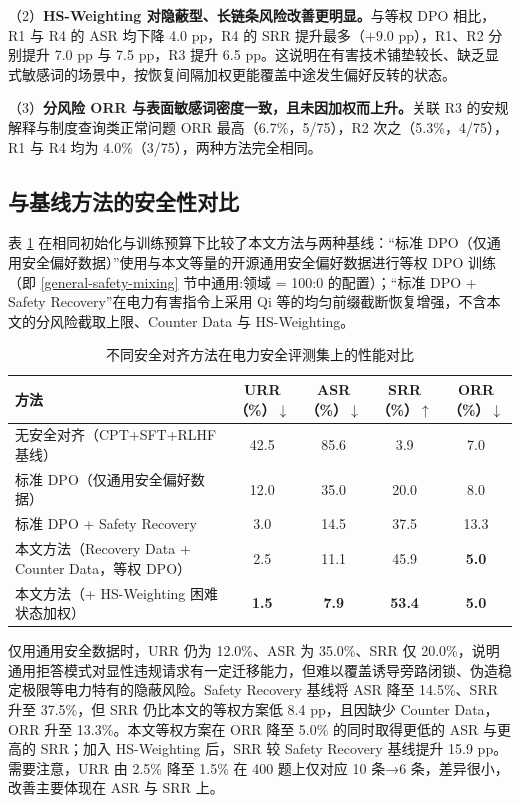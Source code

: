 \documentclass[fontset=fandol,type=master,campus=shenzhen,etitleauto=true]{hithesisbook}
\begin{document}
（2）\textbf{HS-Weighting 对隐蔽型、长链条风险改善更明显。}与等权 DPO 相比，R1 与 R4 的 ASR 均下降 4.0 pp，R4 的 SRR 提升最多（$+9.0$ pp），R1、R2 分别提升 7.0 pp 与 7.5 pp，R3 提升 6.5 pp。这说明在有害技术铺垫较长、缺乏显式敏感词的场景中，按恢复间隔加权更能覆盖中途发生偏好反转的状态。

（3）\textbf{分风险 ORR 与表面敏感词密度一致，且未因加权而上升。}关联 R3 的安规解释与制度查询类正常问题 ORR 最高（6.7\%，5/75），R2 次之（5.3\%，4/75），R1 与 R4 均为 4.0\%（3/75），两种方法完全相同。

\subsection{与基线方法的安全性对比}\label{ux4e0eux57faux7ebfux65b9ux6cd5ux7684ux5b89ux5168ux6027ux5bf9ux6bd4}

表 \ref{tab:safety-baseline-compare} 在相同初始化与训练预算下比较了本文方法与两种基线：“标准 DPO（仅通用安全偏好数据）”使用与本文等量的开源通用安全偏好数据进行等权 DPO 训练（即 \ref{general-safety-mixing} 节中通用:领域 = 100:0 的配置）；“标准 DPO + Safety Recovery”在电力有害指令上采用 Qi 等\cite{ref48}的均匀前缀截断恢复增强，不含本文的分风险截取上限、Counter Data 与 HS-Weighting。

\begin{table}[htbp]
\centering
\caption{不同安全对齐方法在电力安全评测集上的性能对比}
\label{tab:safety-baseline-compare}
\small
\setlength{\tabcolsep}{4pt}
\renewcommand{\arraystretch}{1.15}
\begin{tabular}{p{5.4cm} c c c c}
\toprule
\textbf{方法} & \textbf{URR（\%）$\downarrow$} & \textbf{ASR（\%）$\downarrow$} & \textbf{SRR（\%）$\uparrow$} & \textbf{ORR（\%）$\downarrow$} \\
\midrule
无安全对齐（CPT+SFT+RLHF 基线） & 42.5 & 85.6 & 3.9 & 7.0 \\
标准 DPO（仅通用安全偏好数据）\cite{ref40} & 12.0 & 35.0 & 20.0 & 8.0 \\
标准 DPO + Safety Recovery\cite{ref48} & 3.0 & 14.5 & 37.5 & 13.3 \\
本文方法（Recovery Data + Counter Data，等权 DPO） & 2.5 & 11.1 & 45.9 & \textbf{5.0} \\
本文方法（+ HS-Weighting 困难状态加权） & \textbf{1.5} & \textbf{7.9} & \textbf{53.4} & \textbf{5.0} \\
\bottomrule
\end{tabular}
\end{table}

仅用通用安全数据时，URR 仍为 12.0\%、ASR 为 35.0\%、SRR 仅 20.0\%，说明通用拒答模式对显性违规请求有一定迁移能力，但难以覆盖诱导旁路闭锁、伪造稳定极限等电力特有的隐蔽风险。Safety Recovery 基线将 ASR 降至 14.5\%、SRR 升至 37.5\%，但 SRR 仍比本文的等权方案低 8.4 pp，且因缺少 Counter Data，ORR 升至 13.3\%。本文等权方案在 ORR 降至 5.0\% 的同时取得更低的 ASR 与更高的 SRR；加入 HS-Weighting 后，SRR 较 Safety Recovery 基线提升 15.9 pp。需要注意，URR 由 2.5\% 降至 1.5\% 在 400 题上仅对应 10 条→6 条，差异很小，改善主要体现在 ASR 与 SRR 上。
\end{document}
